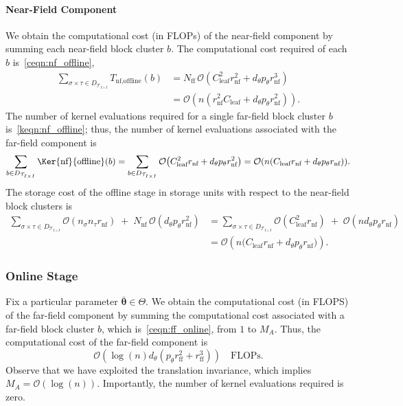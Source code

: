 \documentclass[final,3p,times]{elsarticle}
\newcommand{\mc}[1]{\mathcal{#1}}
\renewcommand{\vec}[1]{\boldsymbol{#1}}
\begin{document}
\paragraph{Near-Field Component} 
We obtain the computational cost (in FLOPs) of the near-field component by summing each near-field block cluster $b$. The computational cost required of each $b$ is~\eqref{ceqn:nf_offline}, 
\begin{equation*}
\begin{aligned}
\sum_{\sigma \times \tau \in D_{\mc{T}_{I \times I}}}
    T_{\text{nf}, \text{offline}}(b)
&= N_{\text{ff}}\,\mc{O}\!\left(C_{\text{leaf}}^{2} r_{\text{nf}}^2 
       + d_{\theta}p_{\theta} r_{\text{nf}}^3\right) \\[6pt]
&= \mc{O}\!\left(n\left(r_{\text{nf}}^2C_{\text{leaf}} 
       + d_{\theta}p_{\theta} r_{\text{nf}}^2\right)\right).
\end{aligned}
\end{equation*}
The number of kernel evaluations required for a single far-field block cluster $b$ is~\eqref{keqn:nf_offline}; thus, the number of kernel evaluations associated with the far-field component is 
$$\sum_{b \in D_{\mc{T}_{I \times I}}}\Ker{\text{nf}}{\text{offline}}(b) = \sum_{b \in D_{\mc{T}_{I \times I}}}\mc{O}\!\left(C_{\text{leaf}}^2 r_{\text{nf}} + d_{\theta} p_{\theta} r_{\text{nf}}^2\right)  = \mc{O}(n(C_{\text{leaf}}r_{\text{nf}} + d_{\theta}p_{\theta}r_{\text{nf}})).$$
The storage cost of the offline stage in storage units with respect to the near-field block clusters is
\begin{equation*}
\begin{aligned}
\sum_{\sigma \times \tau \in D_{\mc{T}_{I \times I}}}
   \mc{O}\!\left(n_{\sigma} n_{\tau} r_{\text{nf}}\right)
   \;+\; N_{\text{nf}}\,\mc{O}\!\left(d_{\theta} p_{\theta} r_{\text{nf}}^2\right) 
&= \sum_{\sigma \times \tau \in D_{\mc{T}_{I \times I}}}
   \mc{O}\!\left(C_{\text{leaf}}^2 r_{\text{nf}}\right)
   \;+\; \mc{O}\!\left(n d_{\theta} p_{\theta} r_{\text{nf}}\right) \\[6pt]
&= \mc{O}\!\left(n\bigl(C_{\text{leaf}}r_{\text{nf}} + d_{\theta} p_{\theta} r_{\text{nf}}\bigr)\right).
\end{aligned}
\end{equation*}





\subsubsection{Online Stage}
Fix a particular parameter $\bar{\vec{\theta}} \in \Theta$.  We obtain the computational cost (in FLOPS) of the far-field component by summing the computational cost associated with a far-field block cluster $b$, which is~\eqref{ceqn:ff_online}, from $1$ to $M_A$. Thus, the computational cost of the far-field component is
$$ \mc{O}(\log(n)d_{\theta}(p_{\theta}r_{\text{ff}}^2 + r_{\text{ff}}^3)) \quad \text{FLOPs}.$$
Observe that we have exploited the translation invariance, which implies $M_{A} = \mc{O}(\log(n))$. Importantly, the number of kernel evaluations required is zero.  
\end{document}
